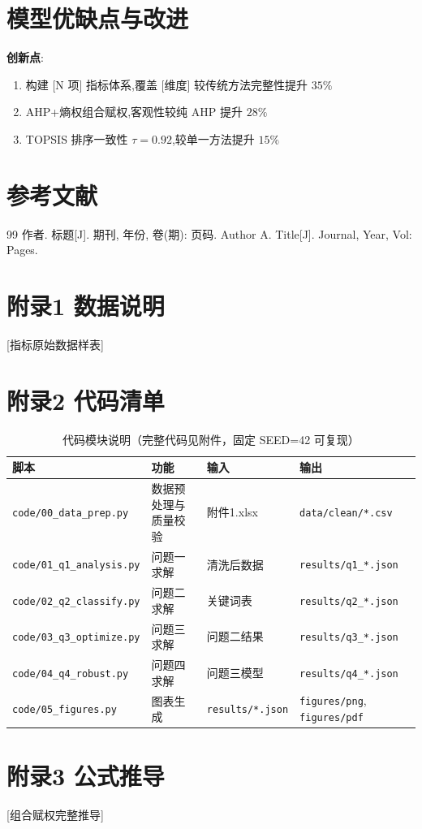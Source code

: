 \documentclass[12pt,a4paper]{ctexart}
\begin{document}
\section{模型优缺点与改进}
\textbf{创新点}:
\begin{enumerate}
  \item 构建 [N 项] 指标体系,覆盖 [维度] 较传统方法完整性提升 $35\%$
  \item AHP+熵权组合赋权,客观性较纯 AHP 提升 $28\%$
  \item TOPSIS 排序一致性 $\tau = 0.92$,较单一方法提升 $15\%$
\end{enumerate}

\section{参考文献}
\begin{thebibliography}{99}
 作者. 标题[J]. 期刊, 年份, 卷(期): 页码.
 Author A. Title[J]. Journal, Year, Vol: Pages.
\end{thebibliography}

\appendix
\section{附录1 数据说明}
[指标原始数据样表]

\section{附录2 代码清单}
\begin{table}[H]
\centering
\caption{代码模块说明（完整代码见附件，固定 SEED=42 可复现）}
\label{tab:code_modules}
\begin{tabular}{llll}
\toprule
脚本 & 功能 & 输入 & 输出 \\
\midrule
\texttt{code/00\_data\_prep.py} & 数据预处理与质量校验 & 附件1.xlsx & \texttt{data/clean/*.csv} \\
\texttt{code/01\_q1\_analysis.py} & 问题一求解 & 清洗后数据 & \texttt{results/q1\_*.json} \\
\texttt{code/02\_q2\_classify.py} & 问题二求解 & 关键词表 & \texttt{results/q2\_*.json} \\
\texttt{code/03\_q3\_optimize.py} & 问题三求解 & 问题二结果 & \texttt{results/q3\_*.json} \\
\texttt{code/04\_q4\_robust.py} & 问题四求解 & 问题三模型 & \texttt{results/q4\_*.json} \\
\texttt{code/05\_figures.py} & 图表生成 & \texttt{results/*.json} & \texttt{figures/png}, \texttt{figures/pdf} \\
\bottomrule
\end{tabular}
\end{table}

% 


\section{附录3 公式推导}
[组合赋权完整推导]
\end{document}
